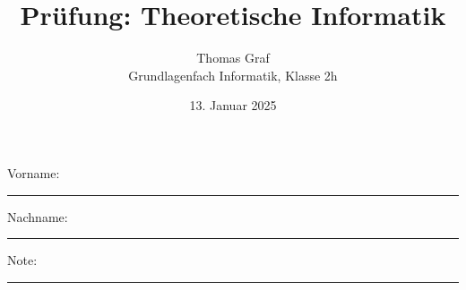 \newtoggle{withbonus} \togglefalse{withbonus} %

\newcommand{\mycourse}{Grundlagenfach Informatik}
\newcommand{\myclass}{Klasse 2h}
\newcommand{\mydate}{13. Januar 2025}

\title{\textbf{Prüfung: Theoretische Informatik}}
\author{Thomas Graf\\
	\mycourse, \myclass}
\date{\mydate}
\maketitle
\thispagestyle{headandfoot}

\begin{center}
\end{center}
\vspace{10mm}

\begin{center}
	Vorname: \rule{45mm}{0.8pt}\qquad Nachname: \rule{45mm}{0.8pt}
\end{center}
\vspace{20mm}

\begin{center}
	\iftoggle{withbonus} {
		\combinedgradetable[h][questions]
	} {
		\gradetable[h][questions]
	}
\end{center}
\vspace{15mm}
\begin{center}
	Note:
	\vspace{10mm}

	\rule{8mm}{1.2pt}
\end{center}
\clearpage


